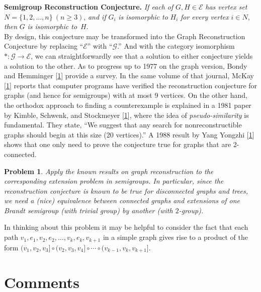 \documentclass{surv-l}
\numberwithin{equation}{section}
\numberwithin{table}{section}
\numberwithin{figure}{section}
\newtheorem{problem}[equation]{Problem}
\theoremstyle{definition}
\begin{document}
\noindent \textbf{Semigroup Reconstruction Conjecture.} \emph{If each
of} $G, H\in \mathcal{E}$ \emph{has vertex set} $N=\{1,2,\ldots,
n\}\ (n\geq 3)$, \emph{and if} $G_{i}$ \emph{is isomorphic to}
$H_{i}$ \emph{for every vertex} $i\in N$, \emph{then} $G$ \emph{is
isomorphic to}~$H$.\\

By design, this conjecture may be transformed into the Graph
Reconstruction Conjecture by replacing ``$\mathcal{E}$'' with
``$\mathcal{G}$.'' And with the category isomorphism
$*:\mathcal{G}\rightarrow \mathcal{E}$, we can straightforwardly
see that a solution to either conjecture yields a solution to the
other. As to progress up to 1977 on the graph version, Bondy and
Hemminger [\hyperlink{bib6}{1}]
provide a survey. In the same volume of that journal,
McKay [\hyperlink{bib51}{1}] reports
that computer programs have verified the reconstruction conjecture
for graphs (and hence for semigroups) with at most 9 vertices. On
the other hand, the orthodox approach to finding a counterexample
is explained in a 1981 paper by Kimble, Schwenk, and Stockmeyer
[\hyperlink{bib35}{1}], where the idea of
\emph{pseudo-similarity} is fundamental. They state, ``We suggest
that any search for nonreconstructible graphs should begin at this
size (20 vertices).'' A 1988 result by Yang Yongzhi [\hyperlink{bib79}{1}] shows that one only need to
prove the conjecture true for graphs that are 2-connected.

\begin{problem}\label{prob13.68.1}
Apply the known results on graph reconstruction to the
corresponding extension problem in semigroups. In particular,
since the reconstruction conjecture is known to be true for
disconnected graphs and trees, we need a (nice) equivalence
between connected graphs and extensions of one Brandt semigroup
(with trivial group) by another (with $2$-group).
\end{problem}

In thinking about this problem it may be helpful to consider
the fact that each path $v_{1},e_{1},v_{2},e_{2},\ldots,v_{k},
e_{k},v_{k+1}$ in a simple graph gives rise to a product of
the form $(v_{1},v_{2},v_{3}]\circ (v_{2}, v_3, v_{4}]\circ\cdots
\circ (v_{k-1}, v_{k}, v_{k+1}]$.

\section{Comments}\label{sec13.69}
\end{document}
